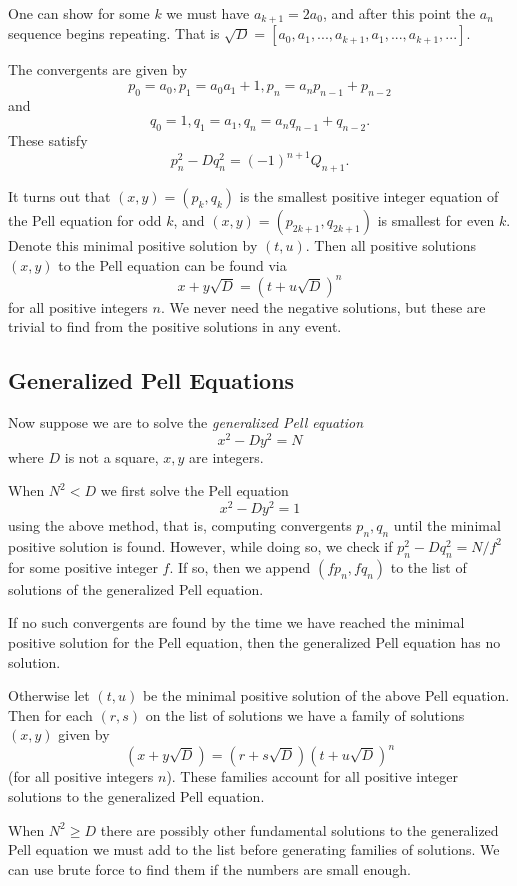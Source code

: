 One can show for some $k$ we must have $a_{k+1} = 2 a_0$, and after
this point the $a_n$ sequence begins repeating. That is
$\sqrt{D} = [a_0, a_1, ..., a_{k+1}, a_1, ..., a_{k+1}, ... ]$.

The convergents are given by
\[ p_0 = a_0, p_1 = a_0 a_1 + 1, p_n = a_n p_{n-1} + p_{n-2} \]
and
\[ q_0 = 1, q_1 = a_1, q_n = a_n q_{n-1} + q_{n-2} .\]
These satisfy
\[ p_n^2 - D q_n^2 = (-1)^{n+1} Q_{n+1} . \]

It turns out that $(x, y) = (p_k, q_k)$ is the smallest positive
integer equation
of the Pell equation for odd $k$, and $(x, y) = (p_{2k+1}, q_{2k+1})$
is smallest for even $k$. Denote this minimal positive solution by $(t, u)$.
Then all positive solutions $(x, y)$ to the Pell equation can be found via
\[ x + y\sqrt{D} = (t+u\sqrt{D})^n\]
for all positive integers $n$. We never need the negative solutions,
but these are trivial to find from the positive solutions in any event.

\subsection {Generalized Pell Equations}

Now suppose we are to solve the \emph{generalized Pell equation}
\[ x^2 - D y^2 = N \]
where $D$ is not a square, $x, y$ are integers.

When $N^2 < D$ we first solve the Pell equation
\[ x^2 - D y^2 = 1 \]
using the above method, that is, computing convergents $p_n, q_n$
until the minimal positive solution is found. However,
while doing so, we check if $p_n^2 - D q_n^2 = N / f^2$ for
some positive integer $f$. If so, then we append $(f p_n, f q_n)$ to
the list of solutions of the generalized Pell equation.

If no such convergents are found by the time we have reached the minimal
positive solution for the Pell equation, then the generalized Pell
equation has no solution.

Otherwise let $(t, u)$ be the minimal positive solution of the above
Pell equation.
Then for each $(r,s)$ on the list of solutions we have a family of
solutions $(x,y)$ given by
\[ (x+y\sqrt{D}) = (r+s\sqrt{D})(t+u\sqrt{D})^n \]
(for all positive integers $n$). These families account for all positive
integer solutions to the generalized Pell equation.

When $N^2 \ge D$ there are possibly other fundamental solutions
to the generalized Pell equation we must add to the list before generating
families of solutions.
We can use brute force to find them if the numbers are small enough.

